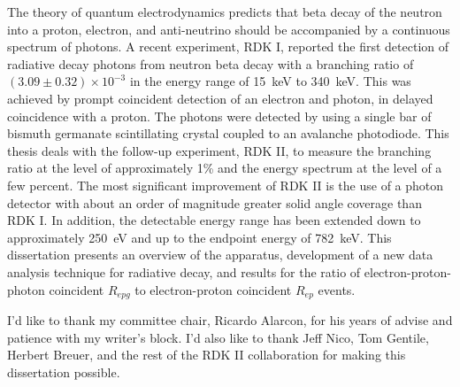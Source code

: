 \documentclass[oneside,12pt]{memoir}
\begin{document}
The theory of quantum electrodynamics predicts that beta decay of the neutron into a proton, electron, and anti-neutrino should be accompanied by a continuous spectrum of photons. A recent experiment, RDK I, reported the first detection of radiative decay photons from neutron beta decay with a branching ratio of $(3.09 \pm 0.32) \times 10^{-3}$ in the energy range of 15~keV to 340~keV. This was achieved by prompt coincident detection of an electron and photon, in delayed coincidence with a proton. The photons were detected by using a single bar of bismuth germanate scintillating crystal coupled to an avalanche photodiode. This thesis deals with the follow-up experiment, RDK II, to measure the branching ratio at the level of approximately 1\% and the energy spectrum at the level of a few percent. The most significant improvement of RDK II is the use of a photon detector with about an order of magnitude greater solid angle coverage than RDK I. In addition, the detectable energy range has been extended down to approximately 250~eV and up to the endpoint energy of 782~keV. This dissertation presents an overview of the apparatus, development of a new data analysis technique for radiative decay, and results for the ratio of electron-proton-photon coincident $R_{epg}$ to electron-proton coincident $R_{ep}$ events.
\clearpage
 

% 

\asuacknowledgements
I'd like to thank my committee chair, Ricardo Alarcon, for his years of advise and patience with my writer's block. I'd also like to thank Jeff Nico, Tom Gentile, Herbert Breuer, and the rest of the RDK II collaboration for making this dissertation possible.
% 

\tableofcontents*
\listoftables   %

\listoffigures  %

\end{document}
